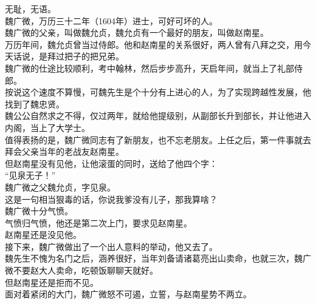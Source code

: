 \begin{multicols}{\theparacolNo}
无耻，无语。\\

魏广微，万历三十二年（1604年）进士，可好可坏的人。\\

魏广微的父亲，叫做魏允贞，魏允贞有一个最好的朋友，叫做赵南星。\\

万历年间，魏允贞曾当过侍郎。他和赵南星的关系很好，两人曾有八拜之交，用今天话说，是拜过把子的把兄弟。\\

魏广微的仕途比较顺利，考中翰林，然后步步高升，天启年间，就当上了礼部侍郎。\\

按说这个速度不算慢，可魏先生是个十分有上进心的人，为了实现跨越性发展，他找到了魏忠贤。\\

魏公公自然求之不得，仅过两年，就给他提级别，从副部长升到部长，并让他进入内阁，当上了大学士。\\

值得表扬的是，魏广微同志有了新朋友，也不忘老朋友。上任之后，第一件事就去拜会父亲当年的老战友赵南星。\\

但赵南星没有见他，让他滚蛋的同时，送给了他四个字：\\

“见泉无子！”\\

魏广微之父魏允贞，字见泉。\\

这是一句相当狠毒的话，你说我爹没有儿子，那我算啥？\\

魏广微十分气愤。\\

气愤归气愤，他还是第二次上门，要求见赵南星。\\

赵南星还是没见他。\\

接下来，魏广微做出了一个出人意料的举动，他又去了。\\

魏先生不愧为名门之后，涵养很好，当年刘备请诸葛亮出山卖命，也就三次，魏广微不要赵大人卖命，吃顿饭聊聊天就好。\\

但赵南星还是拒而不见。\\

面对着紧闭的大门，魏广微怒不可遏，立誓，与赵南星势不两立。\\


\end{multicols}
